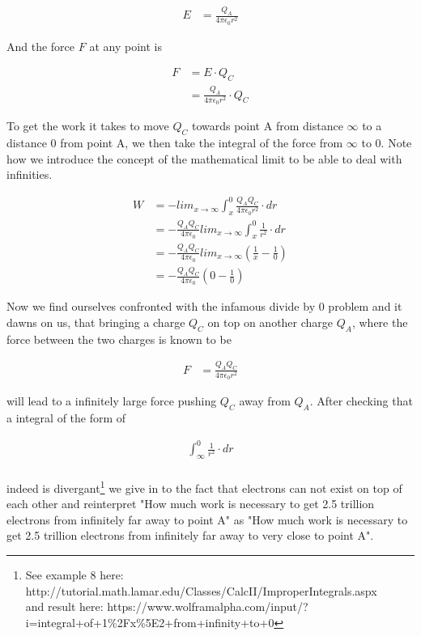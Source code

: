 \documentclass[paper=a4, fontsize=11pt]{scrartcl} %
\numberwithin{equation}{section} %
\numberwithin{figure}{section} %
\numberwithin{table}{section} %
\begin{document}
\begin{align} \label{eq:3}
E &= \frac{Q_A}{4 \pi \epsilon_0 r^2}
\end{align}

And the force $F$ at any point is

\begin{align} \label{eq:4}
F &= E \cdot Q_C \\
  &= \frac{Q_A}{4 \pi \epsilon_0 r^2} \cdot Q_C
\end{align}

To get the work it takes to move $Q_C$ towards point A from distance $\infty$ to a distance 0 from point A,
we then take the integral of the force from $\infty$ to 0. Note how we introduce the concept of the mathematical limit
to be able to deal with infinities.

\begin{align} \label{eq:5}
W &= - lim_{x\to\infty} \int_x^0{\frac{Q_A Q_C}{4 \pi \epsilon_0 r^2}} \cdot dr \\
  &= - \frac{Q_A Q_C}{4 \pi \epsilon_0 } lim_{x\to\infty} \int_x^0{\frac{1}{r^2}} \cdot dr \\
  &= - \frac{Q_A Q_C}{4 \pi \epsilon_0 } lim_{x\to\infty} \left( \frac{1}{x} - \frac{1}{0} \right) \\
  &= - \frac{Q_A Q_C}{4 \pi \epsilon_0 } \left( 0 - \frac{1}{0} \right)
\end{align}

Now we find ourselves confronted with the infamous divide by 0 problem and it dawns on us, that bringing a charge
$Q_C$ on top on another charge $Q_A$, where the force between the two charges is known to be

\begin{align} \label{eq:6}
F &= \frac{Q_A  Q_C}{4 \pi \epsilon_0 r^2}
\end{align}

will lead to a infinitely large force pushing $Q_C$ away from $Q_A$. After checking that a integral of the form of

\begin{align} \label{eq:7}
\int_\infty^0{\frac{1}{r^2}} \cdot dr \\
\end{align}

indeed is divergant\footnote{ See example 8 here: http://tutorial.math.lamar.edu/Classes/CalcII/ImproperIntegrals.aspx \\
and result here: https://www.wolframalpha.com/input/?i=integral+of+1\%2Fx\%5E2+from+infinity+to+0 

} we give in to the fact that electrons can not exist on top of each other and reinterpret "How much work is necessary to get
2.5 trillion electrons from infinitely far away to point A" as "How much work is necessary to get
2.5 trillion electrons from infinitely far away to very close to point A".
\end{document}

